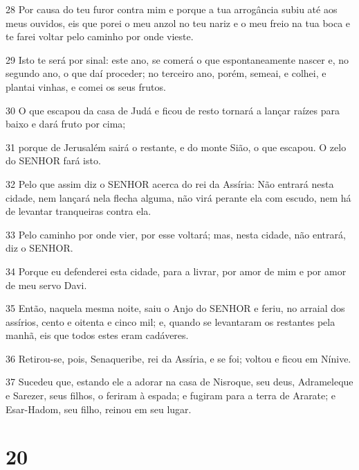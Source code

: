 \par 28 Por causa do teu furor contra mim e porque a tua arrogância subiu até aos meus ouvidos, eis que porei o meu anzol no teu nariz e o meu freio na tua boca e te farei voltar pelo caminho por onde vieste.
\par 29 Isto te será por sinal: este ano, se comerá o que espontaneamente nascer e, no segundo ano, o que daí proceder; no terceiro ano, porém, semeai, e colhei, e plantai vinhas, e comei os seus frutos.
\par 30 O que escapou da casa de Judá e ficou de resto tornará a lançar raízes para baixo e dará fruto por cima;
\par 31 porque de Jerusalém sairá o restante, e do monte Sião, o que escapou. O zelo do SENHOR fará isto.
\par 32 Pelo que assim diz o SENHOR acerca do rei da Assíria: Não entrará nesta cidade, nem lançará nela flecha alguma, não virá perante ela com escudo, nem há de levantar tranqueiras contra ela.
\par 33 Pelo caminho por onde vier, por esse voltará; mas, nesta cidade, não entrará, diz o SENHOR.
\par 34 Porque eu defenderei esta cidade, para a livrar, por amor de mim e por amor de meu servo Davi.
\par 35 Então, naquela mesma noite, saiu o Anjo do SENHOR e feriu, no arraial dos assírios, cento e oitenta e cinco mil; e, quando se levantaram os restantes pela manhã, eis que todos estes eram cadáveres.
\par 36 Retirou-se, pois, Senaqueribe, rei da Assíria, e se foi; voltou e ficou em Nínive.
\par 37 Sucedeu que, estando ele a adorar na casa de Nisroque, seu deus, Adrameleque e Sarezer, seus filhos, o feriram à espada; e fugiram para a terra de Ararate; e Esar-Hadom, seu filho, reinou em seu lugar.

\chapter{20}

